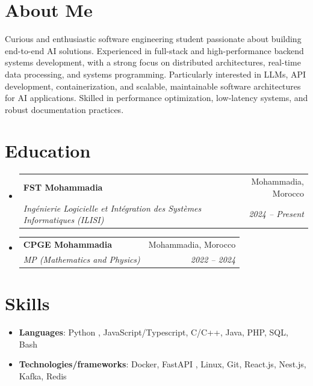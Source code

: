 \documentclass[letterpaper,11pt]{article}
\makeatletter
\newcommand{\resumeSubheading}[4]{
    \vspace{-1pt}\item
        \begin{tabular*}{0.97\textwidth}[t]{l@{\extracolsep{\fill}}r}
            \textbf{#1} & #2 \\
            \textit{\small#3} & \textit{\small #4} \\
        \end{tabular*}\vspace{-5pt}
}
\newcommand{\resumeSubHeadingListStart}{\begin{itemize}[leftmargin=*]}
\newcommand{\resumeSubHeadingListEnd}{\end{itemize}}
\makeatother
\begin{document}
\section{About Me}
Curious and enthusiastic software engineering student passionate about building end-to-end AI solutions. Experienced in full-stack and high-performance backend systems development, with a strong focus on distributed architectures, real-time data processing, and systems programming. Particularly interested in LLMs, API development, containerization, and scalable, maintainable software architectures for AI applications. Skilled in performance optimization, low-latency systems, and robust documentation practices.
\section{Education} \resumeSubHeadingListStart
        \resumeSubheading
            {FST Mohammadia}{Mohammadia, Morocco}
            {Ingénierie Logicielle et Intégration des Systèmes Informatiques (ILISI)}{2024 -- Present}
        \resumeSubheading
            {CPGE Mohammadia}{Mohammadia, Morocco}
            {MP (Mathematics and Physics)}{2022 -- 2024}
    \resumeSubHeadingListEnd




\section{Skills}
 \resumeSubHeadingListStart
     \item{
         \textbf{Languages}{:  Python , JavaScript/Typescript, C/C++, Java, PHP, SQL, Bash} 
     }
        \item{
            \textbf{Technologies/frameworks}{: Docker, FastAPI , Linux,  Git,  React.js, Nest.js, Kafka, Redis}
        
        }
 \resumeSubHeadingListEnd


\end{document}
